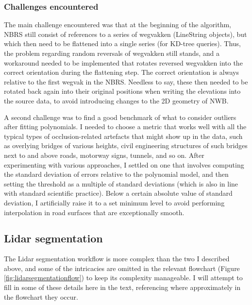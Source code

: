 \subsubsection{Challenges encountered}

The main challenge encountered was that at the beginning of the algorithm, NBRS still consist of references to a series of wegvakken (LineString objects), but which then need to be flattened into a single series (for KD-tree queries). Thus, the problem regarding random reversals of wegvakken still stands, and a workaround needed to be implemented that rotates reversed wegvakken into the correct orientation during the flattening step. The correct orientation is always relative to the first wegvak in the NBRS. Needless to say, these then needed to be rotated back again into their original positions when writing the elevations into the source data, to avoid introducing changes to the 2D geometry of NWB.

A second challenge was to find a good benchmark of what to consider outliers after fitting polynomials. I needed to choose a metric that works well with all the typical types of occlusion-related artefacts that might show up in the data, such as overlying bridges of various heights, civil engineering structures of such bridges next to and above roads, motorway signs, tunnels, and so on. After experimenting with various approaches, I settled on one that involves computing the standard deviation of errors relative to the polynomial model, and then setting the threshold as a multiple of standard deviations (which is also in line with standard scientific practice). Below a certain absolute value of standard deviation, I artificially raise it to a set minimum level to avoid performing interpolation in road surfaces that are exceptionally smooth.

\subsection{Lidar segmentation}
\label{sub:m_lidarsegmentation}

The Lidar segmentation workflow is more complex than the two I described above, and some of the intricacies are omitted in the relevant flowchart (Figure \ref{fig:lidarsegmentationflow}) to keep its complexity manageable. I will attempt to fill in some of these details here in the text, referencing where approximately in the flowchart they occur.

